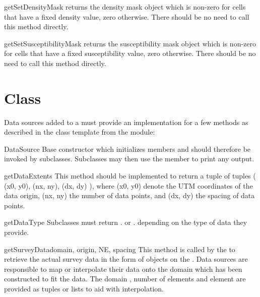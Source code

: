 \begin{methoddesc}[DomainBuilder]{getSetDensityMask}{}
returns the density mask \Data object which is non-zero for cells that have a
fixed density value, zero otherwise.
There should be no need to call this method directly.
\end{methoddesc}

\begin{methoddesc}[DomainBuilder]{getSetSusceptibilityMask}{}
returns the susceptibility mask \Data object which is non-zero for cells that
have a fixed susceptibility value, zero otherwise.
There should be no need to call this method directly.
\end{methoddesc}

\section{ Class}\label{sec:ref:DataSource}

Data sources added to a  must provide an implementation for
a few methods as described in the class template  from
the  module:

\begin{classdesc}{DataSource}{}
Base constructor which initializes members and should therefore be invoked by
subclasses. Subclasses may then use the member  to print any
output.
\end{classdesc}

\begin{methoddesc}[DataSource]{getDataExtents}{}
This method should be implemented to return a tuple of tuples
( (x0, y0), (nx, ny), (dx, dy) ), where (x0, y0) denote the UTM coordinates of
the data origin, (nx, ny) the number of data points, and (dx, dy) the spacing
of data points.
\end{methoddesc}

\begin{methoddesc}[DataSource]{getDataType}{}
Subclasses must return . or
. depending on the type of data they provide.
\end{methoddesc}

\begin{methoddesc}[DataSource]{getSurveyData}{domain, origin, NE, spacing}
This method is called by the  to retrieve the actual survey
data in the form of \Data objects on the .
Data sources are responsible to map or interpolate their data onto the domain
which has been constructed to fit the data.
The domain , number of elements  and element
 are provided as tuples or lists to aid with interpolation.
\end{methoddesc}

